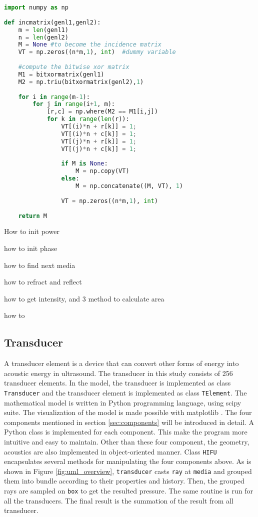 \begin{lstlisting}[language=Python]
import numpy as np
    
def incmatrix(genl1,genl2):
    m = len(genl1)
    n = len(genl2)
    M = None #to become the incidence matrix
    VT = np.zeros((n*m,1), int)  #dummy variable
    
    #compute the bitwise xor matrix
    M1 = bitxormatrix(genl1)
    M2 = np.triu(bitxormatrix(genl2),1) 
    
    for i in range(m-1):
        for j in range(i+1, m):
            [r,c] = np.where(M2 == M1[i,j])
            for k in range(len(r)):
                VT[(i)*n + r[k]] = 1;
                VT[(i)*n + c[k]] = 1;
                VT[(j)*n + r[k]] = 1;
                VT[(j)*n + c[k]] = 1;
    
                if M is None:
                    M = np.copy(VT)
                else:
                    M = np.concatenate((M, VT), 1)
    
                VT = np.zeros((n*m,1), int)
    
    return M
\end{lstlisting}
    
    
How to init power

how to init phase

how to find next media

how to refract and reflect

how to get intensity, and 3 method to calculate area

how to 
\subsection{Transducer}
A transducer element is a device that can convert other forms of energy into acoustic energy in ultrasound. The transducer in this study consists of 256 transducer elements. In the model, the transducer is implemented as class \texttt{Transducer} and the transducer element is implemented as class \texttt{TElement}.
The mathematical model is written in Python programming language, using scipy suite\cite{scipy}. The visualization of the model is made possible with matplotlib \cite{matplotlib}. The four components mentioned in section \ref{sec:components} will be introduced in detail. A Python class is implemented for each component. This make the program more intuitive and easy to maintain. Other than these four component, the geometry, acoustics are also implemented in object-oriented manner. Class \texttt{HIFU} encapsulates several methods for manipulating the four components above. As is shown in Figure \ref{fig:uml_overview}, \texttt{transducer} casts \texttt{ray} at \texttt{media} and grouped them into bundle according to their properties and history. Then, the grouped rays are sampled on \texttt{box} to get the resulted pressure. The same routine is run for all the transducers. The final result is the summation of the result from all transducer.

